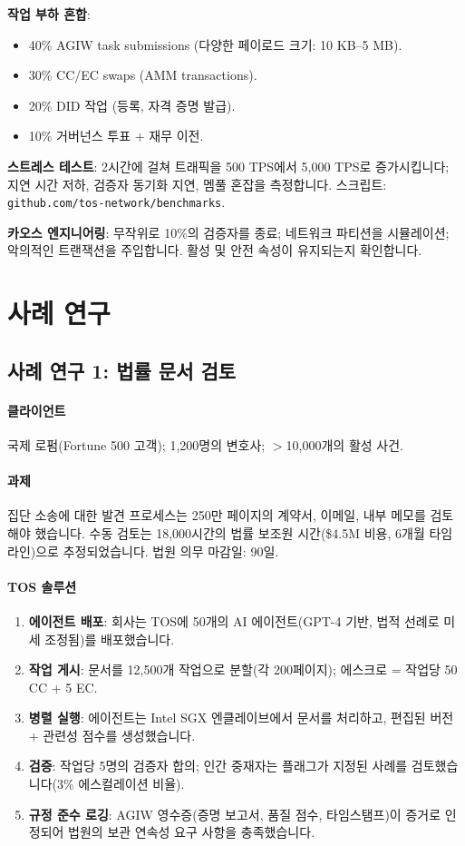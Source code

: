 \documentclass[11pt]{article}
\begin{document}
\textbf{작업 부하 혼합}:
\begin{itemize}[noitemsep]
  \item 40\% AGIW task submissions (다양한 페이로드 크기: 10 KB--5 MB).
  \item 30\% CC/EC swaps (AMM transactions).
  \item 20\% DID 작업 (등록, 자격 증명 발급).
  \item 10\% 거버넌스 투표 + 재무 이전.
\end{itemize}

\textbf{스트레스 테스트}: 2시간에 걸쳐 트래픽을 500 TPS에서 5,000 TPS로 증가시킵니다; 지연 시간 저하, 검증자 동기화 지연, 멤풀 혼잡을 측정합니다. 스크립트: \texttt{github.com/tos-network/benchmarks}.

\textbf{카오스 엔지니어링}: 무작위로 10\%의 검증자를 종료; 네트워크 파티션을 시뮬레이션; 악의적인 트랜잭션을 주입합니다. 활성 및 안전 속성이 유지되는지 확인합니다.

\section{사례 연구}
\label{sec:case-studies}

\subsection{사례 연구 1: 법률 문서 검토}

\paragraph{클라이언트} 국제 로펌(Fortune 500 고객); 1,200명의 변호사; $>$10,000개의 활성 사건.

\paragraph{과제} 집단 소송에 대한 발견 프로세스는 250만 페이지의 계약서, 이메일, 내부 메모를 검토해야 했습니다. 수동 검토는 18,000시간의 법률 보조원 시간(\$4.5M 비용, 6개월 타임라인)으로 추정되었습니다. 법원 의무 마감일: 90일.

\paragraph{TOS 솔루션}
\begin{enumerate}[noitemsep]
  \item \textbf{에이전트 배포}: 회사는 TOS에 50개의 AI 에이전트(GPT-4 기반, 법적 선례로 미세 조정됨)를 배포했습니다.
  \item \textbf{작업 게시}: 문서를 12,500개 작업으로 분할(각 200페이지); 에스크로 = 작업당 50 CC + 5 EC.
  \item \textbf{병렬 실행}: 에이전트는 Intel SGX 엔클레이브에서 문서를 처리하고, 편집된 버전 + 관련성 점수를 생성했습니다.
  \item \textbf{검증}: 작업당 5명의 검증자 합의; 인간 중재자는 플래그가 지정된 사례를 검토했습니다(3\% 에스컬레이션 비율).
  \item \textbf{규정 준수 로깅}: AGIW 영수증(증명 보고서, 품질 점수, 타임스탬프)이 증거로 인정되어 법원의 보관 연속성 요구 사항을 충족했습니다.
\end{enumerate}
\end{document}
